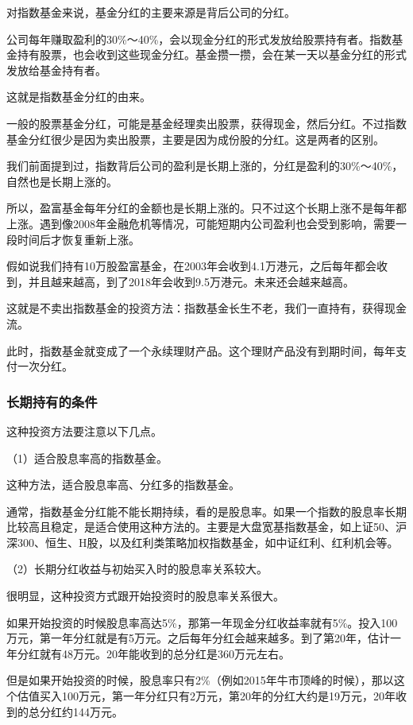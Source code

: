 对指数基金来说，基金分红的主要来源是背后公司的分红。

公司每年赚取盈利的30\%～40\%，会以现金分红的形式发放给股票持有者。指数基金持有股票，也会收到这些现金分红。基金攒一攒，会在某一天以基金分红的形式发放给基金持有者。

这就是指数基金分红的由来。

一般的股票基金分红，可能是基金经理卖出股票，获得现金，然后分红。不过指数基金分红很少是因为卖出股票，主要是因为成份股的分红。这是两者的区别。

我们前面提到过，指数背后公司的盈利是长期上涨的，分红是盈利的30\%～40\%，自然也是长期上涨的。

所以，盈富基金每年分红的金额也是长期上涨的。只不过这个长期上涨不是每年都上涨。遇到像2008年金融危机等情况，可能短期内公司盈利也会受到影响，需要一段时间后才恢复重新上涨。

假如说我们持有10万股盈富基金，在2003年会收到4.1万港元，之后每年都会收到，并且越来越高，到了2018年会收到9.5万港元。未来还会越来越高。

这就是不卖出指数基金的投资方法：指数基金长生不老，我们一直持有，获得现金流。

此时，指数基金就变成了一个永续理财产品。这个理财产品没有到期时间，每年支付一次分红。

\subsubsection{长期持有的条件}

这种投资方法要注意以下几点。

（1）适合股息率高的指数基金。

这种方法，适合股息率高、分红多的指数基金。

通常，指数基金分红能不能长期持续，看的是股息率。如果一个指数的股息率长期比较高且稳定，是适合使用这种方法的。主要是大盘宽基指数基金，如上证50、沪深300、恒生、H股，以及红利类策略加权指数基金，如中证红利、红利机会等。

（2）长期分红收益与初始买入时的股息率关系较大。

很明显，这种投资方式跟开始投资时的股息率关系很大。

如果开始投资的时候股息率高达5\%，那第一年现金分红收益率就有5\%。投入100万元，第一年分红就是有5万元。之后每年分红会越来越多。到了第20年，估计一年分红就有48万元。20年能收到的总分红是360万元左右。

但是如果开始投资的时候，股息率只有2\%（例如2015年牛市顶峰的时候），那以这个估值买入100万元，第一年分红只有2万元，第20年的分红大约是19万元，20年收到的总分红约144万元。

